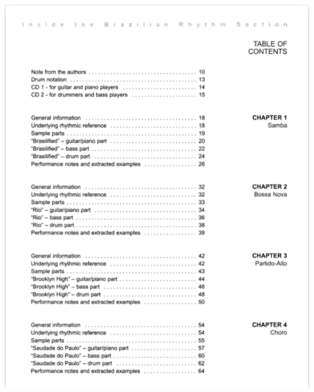 \documentclass[a4paper]{book}
\begin{document}
\begin{center}
\includegraphics[width=14.339cm,height=18.015cm]{lebluessupportsmethodes-img171.png}
\end{center}
\end{document}
